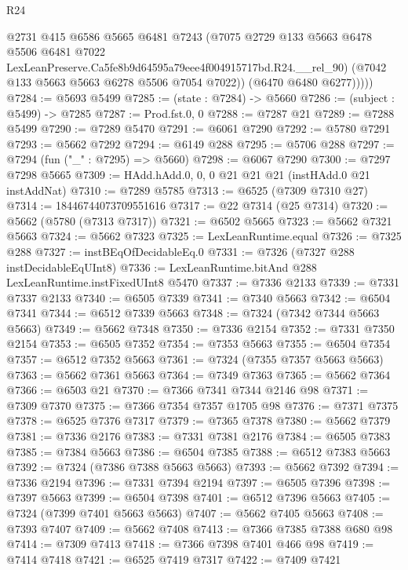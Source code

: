 \begin{lexlean}{R24}
\begin{coremodule}
              @2731
              @415
              @6586
              @5665
              @6481
              @7243
              (@7075
                @2729
                @133
                @5663
                @6478
                @5506
                @6481
                @7022
                LexLeanPreserve.Ca5fe8b9d64595a79eee4f004915717bd.R24.__rel_90)
              (@7042 @133 @5663 @5663 @6278 @5506 @7054 @7022))
            (@6470 @6480 @6277)))))
@7284 := @5693 @5499
@7285 := (state : @7284) -> @5660
@7286 := (subject : @5499) -> @7285
@7287 := Prod.fst.{0, 0}
@7288 := @7287 @21
@7289 := @7288 @5499
@7290 := @7289 @5470
@7291 := @6061 @7290
@7292 := @5780 @7291
@7293 := @5662 @7292
@7294 := @6149 @288
@7295 := @5706 @288
@7297 := @7294 (fun ("_" : @7295) => @5660)
@7298 := @6067 @7290
@7300 := @7297 @7298 @5665
@7309 := HAdd.hAdd.{0, 0, 0} @21 @21 @21 (instHAdd.{0} @21 instAddNat)
@7310 := @7289 @5785
@7313 := @6525 (@7309 @7310 @27)
@7314 := 18446744073709551616
@7317 := @22 @7314 (@25 @7314)
@7320 := @5662 (@5780 (@7313 @7317))
@7321 := @6502 @5665
@7323 := @5662 @7321 @5663
@7324 := @5662 @7323
@7325 := LexLeanRuntime.equal
@7326 := @7325 @288
@7327 := instBEqOfDecidableEq.{0}
@7331 := @7326 (@7327 @288 instDecidableEqUInt8)
@7336 := LexLeanRuntime.bitAnd @288 LexLeanRuntime.instFixedUInt8 @5470
@7337 := @7336 @2133
@7339 := @7331 @7337 @2133
@7340 := @6505 @7339
@7341 := @7340 @5663
@7342 := @6504 @7341
@7344 := @6512 @7339 @5663
@7348 := @7324 (@7342 @7344 @5663 @5663)
@7349 := @5662 @7348
@7350 := @7336 @2154
@7352 := @7331 @7350 @2154
@7353 := @6505 @7352
@7354 := @7353 @5663
@7355 := @6504 @7354
@7357 := @6512 @7352 @5663
@7361 := @7324 (@7355 @7357 @5663 @5663)
@7363 := @5662 @7361 @5663
@7364 := @7349 @7363
@7365 := @5662 @7364
@7366 := @6503 @21
@7370 := @7366 @7341 @7344 @2146 @98
@7371 := @7309 @7370
@7375 := @7366 @7354 @7357 @1705 @98
@7376 := @7371 @7375
@7378 := @6525 @7376 @7317
@7379 := @7365 @7378
@7380 := @5662 @7379
@7381 := @7336 @2176
@7383 := @7331 @7381 @2176
@7384 := @6505 @7383
@7385 := @7384 @5663
@7386 := @6504 @7385
@7388 := @6512 @7383 @5663
@7392 := @7324 (@7386 @7388 @5663 @5663)
@7393 := @5662 @7392
@7394 := @7336 @2194
@7396 := @7331 @7394 @2194
@7397 := @6505 @7396
@7398 := @7397 @5663
@7399 := @6504 @7398
@7401 := @6512 @7396 @5663
@7405 := @7324 (@7399 @7401 @5663 @5663)
@7407 := @5662 @7405 @5663
@7408 := @7393 @7407
@7409 := @5662 @7408
@7413 := @7366 @7385 @7388 @680 @98
@7414 := @7309 @7413
@7418 := @7366 @7398 @7401 @466 @98
@7419 := @7414 @7418
@7421 := @6525 @7419 @7317
@7422 := @7409 @7421

\end{coremodule}
\end{lexlean}
